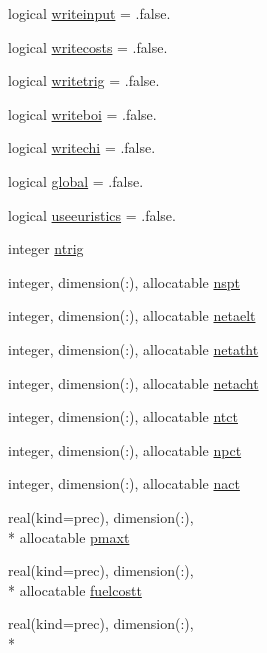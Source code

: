 \begin{DoxyCompactItemize}
\item 
logical \hyperlink{classinputvar_a97c8b194b0db24c1c790d57bcc7b0f70}{writeinput} = .false.
\item 
logical \hyperlink{classinputvar_a5fa854d48ca73d10b807273f373076b2}{writecosts} = .false.
\item 
logical \hyperlink{classinputvar_a676701049b4d18d378d94894b1fcae7b}{writetrig} = .false.
\item 
logical \hyperlink{classinputvar_adfc2c014d1631c831bd700d9ff13dcff}{writeboi} = .false.
\item 
logical \hyperlink{classinputvar_a6e34f329672526cc9e682125013ce5e7}{writechi} = .false.
\item 
logical \hyperlink{classinputvar_aa558f36057a5ae647fb16b9659b90d04}{global} = .false.
\item 
logical \hyperlink{classinputvar_a04f11d38b133803024202cc546abddc3}{useeuristics} = .false.
\item 
integer \hyperlink{classinputvar_ae4403f5c5b16bf2cbd2b607a87e5ee9a}{ntrig}
\item 
integer, dimension(\-:), allocatable \hyperlink{classinputvar_a0c86e9a7915872ee547e5bd8802611e7}{nspt}
\item 
integer, dimension(\-:), allocatable \hyperlink{classinputvar_a2bfcb389a7fba156b8c1146150a71f51}{netaelt}
\item 
integer, dimension(\-:), allocatable \hyperlink{classinputvar_acebcf3d64f116183dd364e920288729f}{netatht}
\item 
integer, dimension(\-:), allocatable \hyperlink{classinputvar_a7f82eda09f512dfe2f28f82efc5187ad}{netacht}
\item 
integer, dimension(\-:), allocatable \hyperlink{classinputvar_ad5c9bbca95851da9fa84642ea414e6be}{ntct}
\item 
integer, dimension(\-:), allocatable \hyperlink{classinputvar_a0f5eeaa6713564c7a3aa547b8ce8bae9}{npct}
\item 
integer, dimension(\-:), allocatable \hyperlink{classinputvar_aecb7a7ef500aee2174166b23b5c72e2a}{nact}
\item 
real(kind=prec), dimension(\-:), \\*
allocatable \hyperlink{classinputvar_a0a9434332c855a12ef886b675af68d35}{pmaxt}
\item 
real(kind=prec), dimension(\-:), \\*
allocatable \hyperlink{classinputvar_a85ccff6d868e650d2255bb9faa7c31be}{fuelcostt}
\item 
real(kind=prec), dimension(\-:), \\*

\end{DoxyCompactItemize}

